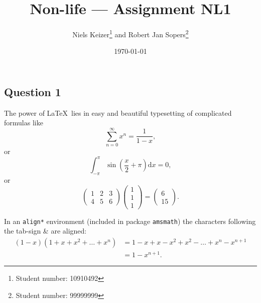 \documentclass[11pt]{article}
\title{Non-life --- Assignment NL1}  %
\author{
  Niels Keizer\footnote{Student number: 10910492}
  \quad and \quad
  Robert Jan Sopers\footnote{Student number: 99999999}
}
\date{\today}
\begin{document}
\maketitle

\subsection*{Question 1}

The power of \LaTeX~lies in easy and beautiful typesetting of complicated formulas like
\[
   \sum_{n=0}^\infty x^n = \frac{1}{1-x},
\]
or
\[
   \int_{-\pi}^{\pi} \sin \left(\frac{x}{2}+\pi\right) \text{d}x = 0,
\]
or
\[
  \begin{pmatrix}
    1 & 2 & 3 \\ %
    4 & 5 & 6
  \end{pmatrix}
  \begin{pmatrix}
    1 \\ 1 \\ 1
  \end{pmatrix}
  =
  \begin{pmatrix}
    6 \\ 15
  \end{pmatrix}.
\]

In an \verb!align*! environment (included in package \verb!amsmath!) the characters following the tab-sign \& are aligned:
\begin{align*}
  ( 1 - x ) ( 1 + x + x^2 + \ldots + x^n )
  & = 
  1 - x + x - x^2 + x^2 - \ldots + x^n - x^{n+1}
  \\ %
  & =
  1 - x^{n+1}.
\end{align*}
\end{document}
